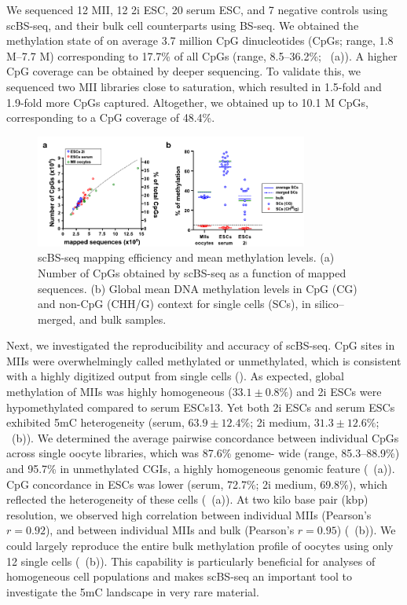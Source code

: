 We sequenced 12 MII, 12 2i ESC, 20 serum ESC, and 7 negative controls using scBS-seq, and their bulk cell counterparts using BS-seq. We obtained the methylation state of on average 3.7 million CpG dinucleotides (CpGs; range, 1.8 M–7.7 M) corresponding to 17.7\% of all CpGs (range, 8.5–36.2\%; ~(a)). A higher CpG coverage can be obtained by deeper sequencing. To validate this, we sequenced two MII libraries close to saturation, which resulted in 1.5-fold and 1.9-fold more CpGs captured. Altogether, we obtained up to 10.1 M CpGs, corresponding to a CpG coverage of 48.4\%.

\begin{figure}[htbp!]
\centering
\includegraphics[width=0.8\textwidth]{qc}
\caption[scBS-seq mapping efficiency and mean methylation levels.]{scBS-seq mapping efficiency and mean methylation levels. (a) Number of CpGs obtained by scBS-seq as a function of mapped sequences. (b) Global mean DNA methylation levels in CpG (CG) and non-CpG (CHH/G) context for single cells (SCs), in silico–merged, and bulk samples. }
\label{fig:bs_qc}
\end{figure}

Next, we investigated the reproducibility and accuracy of scBS-seq. CpG sites in MIIs were overwhelmingly called methylated or unmethylated, which is consistent with a highly digitized output from single cells (). As expected, global methylation of MIIs was highly homogeneous ($33.1 \pm 0.8\%$) and 2i ESCs were hypomethylated compared to serum ESCs13. Yet both 2i ESCs and serum ESCs exhibited 5mC heterogeneity (serum, $63.9 \pm 12.4\%$; 2i medium, $31.3 \pm 12.6\%$; ~(b)). We determined the average pairwise concordance between individual CpGs across single oocyte libraries, which was 87.6\% genome- wide (range, 85.3–88.9\%) and 95.7\% in unmethylated CGIs, a highly homogeneous genomic feature (~(a)). CpG concordance in ESCs was lower (serum, 72.7\%; 2i medium, 69.8\%), which reflected the heterogeneity of these cells (~(a)). At two kilo base pair (kbp) resolution, we observed high correlation between individual MIIs (Pearson's $r=0.92$), and between individual MIIs and bulk (Pearson's $r=0.95$) (~(b)). We could largely reproduce the entire bulk methylation profile of oocytes using only 12 single cells (~(b)). This capability is particularly beneficial for analyses of homogeneous cell populations and makes scBS-seq an important tool to investigate the 5mC landscape in very rare material.

